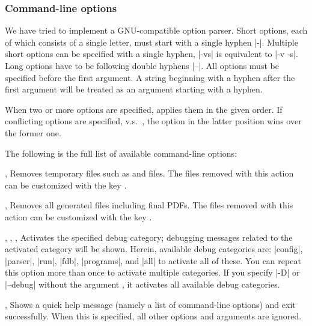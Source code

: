\documentclass[draft]{llmk-doc}
\begin{document}
\subsubsection*{Command-line options }

We have tried to implement a GNU-compatible option parser. Short options, each of
which consists of a single letter, must start with a single hyphen |-|.
Multiple short options can be specified with a single hyphen, \eg |-vs| is
equivalent to |-v -s|. Long options have to be following double hyphens |--|.
All options must be specified before the first argument. A string beginning
with a hyphen after the first argument will be treated as an argument starting
with a hyphen.

When two or more options are specified,  applies them in the given
order. If conflicting options are specified, \eg {} v.s.\ , the
option in the latter position wins over the former one.

The following is the full list of available command-line options:

\begin{clopt}{, }
Removes temporary files such as  and  files. The files
removed with this action can be customized with the key .
\end{clopt}

\begin{clopt}{, }
Removes all generated files including final PDFs. The files removed with this
action can be customized with the key .
\end{clopt}

\begin{clopt}{%
  , ,
  , }
Activates the specified debug category; debugging messages related to the
activated category will be shown. Herein, available debug categories are:
|config|, |parser|, |run|, |fdb|, |programs|, and |all| to activate all of
these. You can repeat this option more than once to activate multiple
categories. If you specify |-D| or |--debug| without the argument
, it activates all available debug categories.
\end{clopt}

\begin{clopt}{, }
Shows a quick help message (namely a list of command-line options) and exit
successfully. When this is specified, all other options and arguments are
ignored.
\end{clopt}
\end{document}
